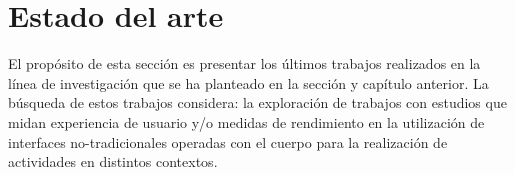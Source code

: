 \section{Estado del arte}
\label{sec:estado_arte}
El propósito de esta sección es presentar los últimos trabajos realizados en la línea de 
investigación que se ha planteado en la sección y capítulo anterior. La búsqueda de estos trabajos considera: la exploración de trabajos con estudios que midan experiencia de usuario y/o medidas de rendimiento en la utilización de interfaces no-tradicionales operadas con el cuerpo para la realización de actividades en distintos contextos.